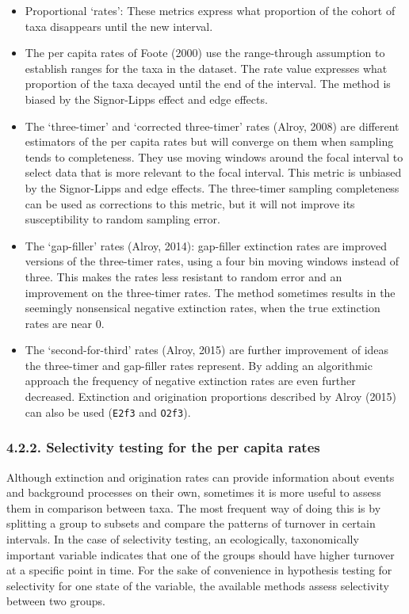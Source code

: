 \documentclass[]{article}
\begin{document}
\begin{itemize}
\item
  Proportional `rates': These metrics express what proportion of the
  cohort of taxa disappears until the new interval.
\item
  The per capita rates of Foote (2000) use the range-through assumption
  to establish ranges for the taxa in the dataset. The rate value
  expresses what proportion of the taxa decayed until the end of the
  interval. The method is biased by the Signor-Lipps effect and edge
  effects.
\item
  The `three-timer' and `corrected three-timer' rates (Alroy, 2008) are
  different estimators of the per capita rates but will converge on them
  when sampling tends to completeness. They use moving windows around
  the focal interval to select data that is more relevant to the focal
  interval. This metric is unbiased by the Signor-Lipps and edge
  effects. The three-timer sampling completeness can be used as
  corrections to this metric, but it will not improve its susceptibility
  to random sampling error.
\item
  The `gap-filler' rates (Alroy, 2014): gap-filler extinction rates are
  improved versions of the three-timer rates, using a four bin moving
  windows instead of three. This makes the rates less resistant to
  random error and an improvement on the three-timer rates. The method
  sometimes results in the seemingly nonsensical negative extinction
  rates, when the true extinction rates are near 0.
\item
  The `second-for-third' rates (Alroy, 2015) are further improvement of
  ideas the three-timer and gap-filler rates represent. By adding an
  algorithmic approach the frequency of negative extinction rates are
  even further decreased. Extinction and origination proportions
  described by Alroy (2015) can also be used (\texttt{E2f3} and
  \texttt{O2f3}).
\end{itemize}

\hypertarget{selectivity-testing-for-the-per-capita-rates}{%
\subsubsection{4.2.2. Selectivity testing for the per capita
rates}\label{selectivity-testing-for-the-per-capita-rates}}

Although extinction and origination rates can provide information about
events and background processes on their own, sometimes it is more
useful to assess them in comparison between taxa. The most frequent way
of doing this is by splitting a group to subsets and compare the
patterns of turnover in certain intervals. In the case of selectivity
testing, an ecologically, taxonomically important variable indicates
that one of the groups should have higher turnover at a specific point
in time. For the sake of convenience in hypothesis testing for
selectivity for one state of the variable, the available methods assess
selectivity between two groups.
\end{document}
